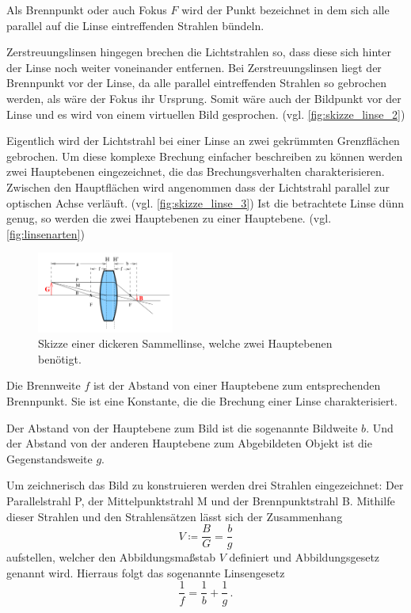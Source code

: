 Als Brennpunkt oder auch Fokus $F$ wird der Punkt bezeichnet in dem sich alle parallel auf die Linse eintreffenden Strahlen bündeln.

Zerstreuungslinsen hingegen brechen die Lichtstrahlen so, dass diese sich hinter der Linse noch weiter voneinander entfernen.
Bei Zerstreuungslinsen liegt der Brennpunkt vor der Linse, da alle parallel eintreffenden Strahlen so gebrochen werden, als wäre der Fokus ihr Ursprung.
Somit wäre auch der Bildpunkt vor der Linse und es wird von einem virtuellen Bild gesprochen. (vgl. \autoref{fig:skizze_linse_2})

Eigentlich wird der Lichtstrahl bei einer Linse an zwei gekrümmten Grenzflächen gebrochen. 
Um diese komplexe Brechung einfacher beschreiben zu können werden zwei Hauptebenen eingezeichnet, die das Brechungsverhalten charakterisieren. 
Zwischen den Hauptflächen wird angenommen dass der Lichtstrahl parallel zur optischen Achse verläuft. (vgl. \autoref{fig:skizze_linse_3})
Ist die betrachtete Linse dünn genug, so werden die zwei Hauptebenen zu einer Hauptebene. (vgl. \autoref{fig:linsenarten})

\begin{figure}
    \centering
    \includegraphics[width=0.4\textwidth]{images/skizze_linse_3.png}
    \caption{Skizze einer dickeren Sammellinse, welche zwei Hauptebenen benötigt.\cite{V408}}
    \label{fig:skizze_linse_3}
\end{figure}

Die Brennweite $f$ ist der Abstand von einer Hauptebene zum entsprechenden Brennpunkt. 
Sie ist eine Konstante, die die Brechung einer Linse charakterisiert.

Der Abstand von der Hauptebene zum Bild ist die sogenannte Bildweite $b$.
Und der Abstand von der anderen Hauptebene zum Abgebildeten Objekt ist die Gegenstandsweite $g$.

Um zeichnerisch das Bild zu konstruieren werden drei Strahlen eingezeichnet: Der Parallelstrahl P, der Mittelpunktstrahl M und der Brennpunktstrahl B. 
Mithilfe dieser Strahlen und den Strahlensätzen lässt sich der Zusammenhang
\begin{equation}
    V \coloneqq \frac{B}{G} = \frac{b}{g}
    \label{eq:abbildungsgesetz}
\end{equation}
aufstellen, welcher den Abbildungsmaßstab $V$ definiert und Abbildungsgesetz genannt wird.
Hierraus folgt das sogenannte Linsengesetz
\begin{equation}
    \frac{1}{f} = \frac{1}{b} + \frac{1}{g} \, .
    \label{eq:linsengesetz}
\end{equation}

